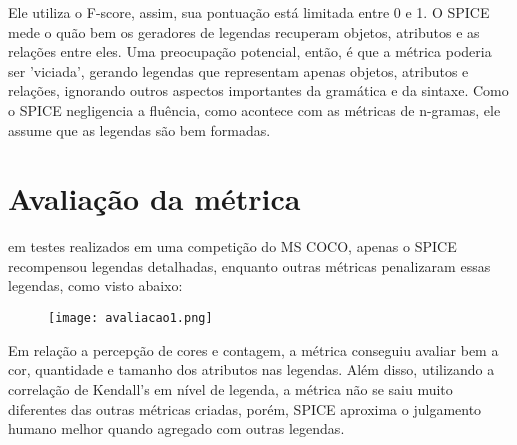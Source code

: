 \documentclass[12pt]{article}
\begin{document}
Ele utiliza o F-score, assim, sua pontuação está limitada entre 0 e 1. O SPICE mede o quão bem os geradores de legendas recuperam objetos, atributos e as relações entre eles. Uma preocupação potencial, então, é que a métrica poderia ser 'viciada', gerando legendas que representam apenas objetos, atributos e relações, ignorando outros aspectos importantes da gramática e da sintaxe. Como o SPICE negligencia a fluência, como acontece com as métricas de n-gramas, ele assume que as legendas são bem formadas.

\section*{Avaliação da métrica}

em testes realizados em uma competição do MS COCO, apenas o SPICE recompensou legendas detalhadas, enquanto outras métricas penalizaram essas legendas, como visto abaixo:

\begin{figure}[H]
    \centering
    \texttt{[image: avaliacao1.png]}
\end{figure}

Em relação a percepção de cores e contagem, a métrica conseguiu avaliar bem a cor, quantidade e tamanho dos atributos nas legendas. Além disso, utilizando a correlação de Kendall's em nível de legenda, a métrica não se saiu muito diferentes das outras métricas criadas, porém, SPICE aproxima o julgamento humano melhor quando agregado com outras legendas.
\end{document}
